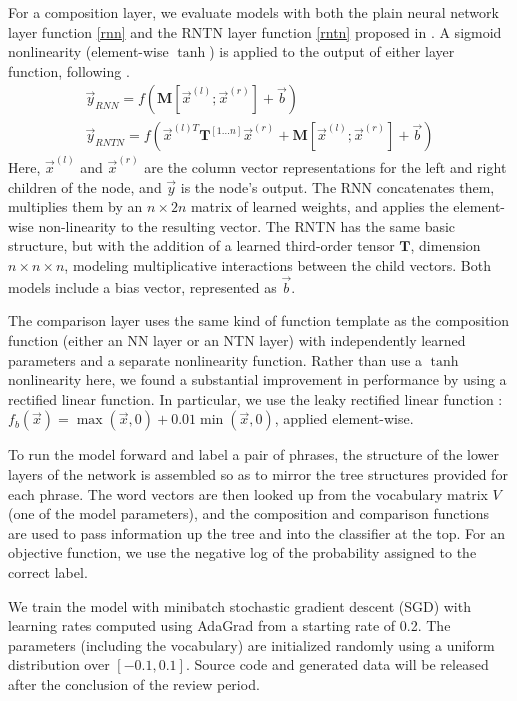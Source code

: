 For a composition layer, we evaluate models with both the plain neural
network layer function \eqref{rnn} and the RNTN layer function
\eqref{rntn} proposed in \citet{chen2013learning}. A sigmoid
nonlinearity (element-wise $\tanh$) is applied to the output of either
layer function, following \cite{socher2013acl1}.
%
\begin{gather} \label{rnn}
\vec{y}_{\textit{RNN}} = f(\mathbf{M} [\vec{x}^{(l)}; \vec{x}^{(r)}] + \vec{b}) \\ %
\label{rntn}
\vec{y}_{\textit{RNTN}} = f(\vec{x}^{(l)T} \mathbf{T}^{[1 \ldots n]} \vec{x}^{(r)} + \mathbf{M} [\vec{x}^{(l)}; \vec{x}^{(r)}] + \vec{b})
\end{gather} %
%
Here, $\vec{x}^{(l)}$ and $\vec{x}^{(r)}$ are the column vector
representations for the left and right children of the node, and
$\vec{y}$ is the node's output.  The RNN concatenates them, multiplies
them by an $n \times 2n$ matrix of learned weights, and applies the
element-wise non-linearity to the resulting vector. The RNTN has the
same basic structure, but with the addition of a learned third-order
tensor $\mathbf{T}$, dimension $n \times n \times n$, modeling
multiplicative interactions between the child vectors. Both models
include a bias vector, represented as $\vec{b}$.

The comparison layer uses the same kind of function template as the
composition function (either an NN layer or an NTN layer) with
independently learned parameters and a separate nonlinearity function.
Rather than use a $\tanh$ nonlinearity here, we found a substantial
improvement in performance by using a rectified linear function. In
particular, we use the leaky rectified linear function
\cite{maasrectifier}: $f_{b}(\vec{x})=\max(\vec{x}, 0) +
0.01\min(\vec{x}, 0)$, applied element-wise.

To run the model forward and label a pair of phrases, the structure of
the lower layers of the network is assembled so as to mirror the tree
structures provided for each phrase. The word vectors are then looked
up from the vocabulary matrix $V$ (one of the model parameters), and
the composition and comparison functions are used to pass information
up the tree and into the classifier at the top. For an objective
function, we use the negative log of the probability assigned to the
correct label.

We train the model with minibatch stochastic gradient descent (SGD)
with learning rates computed using AdaGrad \cite{duchi2011adaptive}
from a starting rate of 0.2. The parameters (including the vocabulary)
are initialized randomly using a uniform distribution over $[-0.1,
0.1]$. %
Source code and generated data will be released after the conclusion
of the review period.

